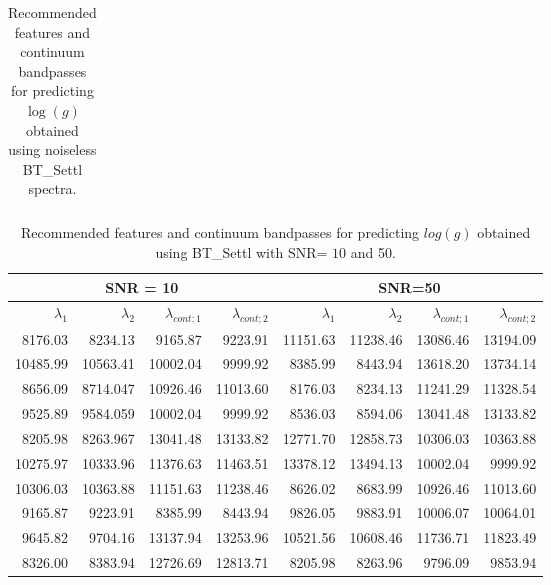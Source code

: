 \begin{appendix}
\begin{table}
\begin{center}
\begin{tabular}{rrrrrrr}
\hline
\end{tabular}
\caption {Recommended features and continuum bandpasses for predicting
  $\log(g)$ obtained using noiseless BT\_Settl
  spectra.} \label{tab:irtf-logg-noiseless}
\end{center}
\end{table}

\begin{table*}
\begin{center}
\begin{tabular}{rrrr | rrrr}
  \hline
 \multicolumn{4}{c}{SNR = 10} &  \multicolumn{4}{c}{SNR=50} \\
  \hline
$\lambda_1$ & $\lambda_2$ & $\lambda_{cont;1}$ & $\lambda_{cont;2} $ & $\lambda_1$ & $\lambda_2$ & $\lambda_{cont;1}$ & $\lambda_{cont;2} $ \\ 
  \hline
     8176.03  & 8234.13  &	9165.87  & 9223.91  &  11151.63 & 11238.46 &      13086.46 & 13194.09 \\
     10485.99 & 10563.41 &	10002.04 & 9999.92  &  8385.99  & 8443.94  &      13618.20 & 13734.14 \\
     8656.09  & 8714.047 &      10926.46 & 11013.60 &  8176.03  & 8234.13  &      11241.29 & 11328.54 \\
     9525.89  & 9584.059 &	10002.04 & 9999.92  &  8536.03  & 8594.06  &      13041.48 & 13133.82 \\ 
     8205.98  & 8263.967 &	13041.48 & 13133.82 &  12771.70 & 12858.73 &      10306.03 & 10363.88 \\
     10275.97 & 10333.96 &	11376.63 & 11463.51 &  13378.12 & 13494.13 &      10002.04 & 9999.92  \\
     10306.03 & 10363.88 &	11151.63 & 11238.46 &  8626.02  & 8683.99  &      10926.46 & 11013.60 \\
     9165.87  & 9223.91  &	8385.99  & 8443.94  &  9826.05  & 9883.91  &      10006.07 & 10064.01 \\
     9645.82  & 9704.16  &	13137.94 & 13253.96 &  10521.56 & 10608.46 &      11736.71 & 11823.49 \\
     8326.00  & 8383.94  &	12726.69 & 12813.71 &  8205.98  & 8263.96  &      9796.09  & 9853.94  \\ 
   \hline
\end{tabular}
\caption {Recommended features and continuum bandpasses for predicting $log(g)$ 
      obtained using BT\_Settl with SNR= $10$ and
      50.} \label{tab:irtf-logg-noisy}
\end{center}
\end{table*}


\end{appendix}
